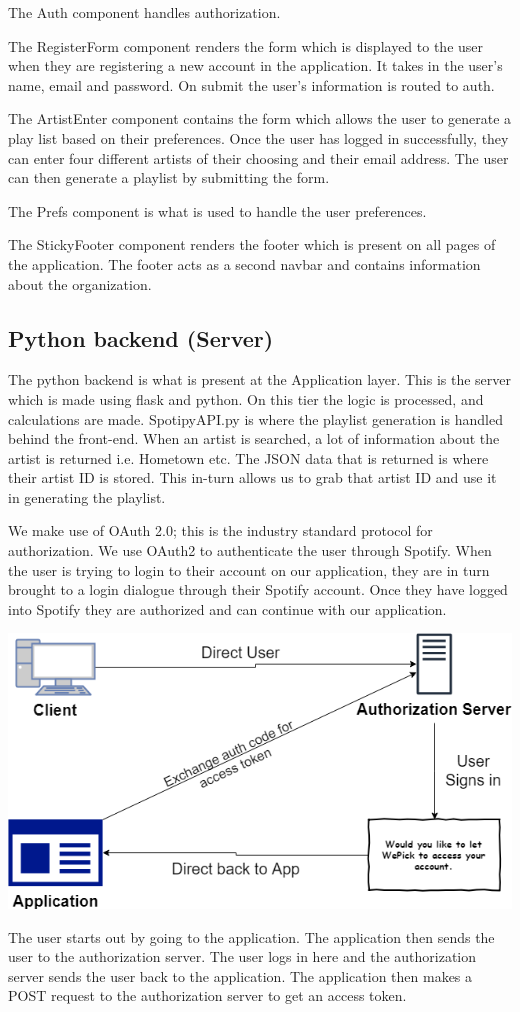 The Auth component handles authorization.

The RegisterForm component renders the form which is displayed to the user when they are registering a new account in the application. It takes in the user’s name, email and password. On submit the user’s information is routed to auth.

The ArtistEnter component contains the form which allows the user to generate a play list based on their preferences. Once the user has logged in successfully, they can enter four different artists of their choosing and their email address. The user can then generate a playlist by submitting the form.

The Prefs component is what is used to handle the user preferences.

The StickyFooter component renders the footer which is present on all pages of the application. The footer acts as a second navbar and contains information about the organization.

\subsection{Python backend (Server)}
The python backend is what is present at the Application layer. This is the server which is made using flask and python. On this tier the logic is processed, and calculations are made.
SpotipyAPI.py is where the playlist generation is handled behind the front-end. When an artist is searched, a lot of information about the artist is returned i.e. Hometown etc.
The JSON data that is returned is where their artist ID is stored. This in-turn allows us to grab that artist ID and use it in generating the playlist. 

We make use of OAuth 2.0; this is the industry standard protocol for authorization. We use OAuth2 to authenticate the user through Spotify. When the user is trying to login to their account on our application, they are in turn brought to a login dialogue through their Spotify account. Once they have logged into Spotify they are authorized and can continue with our application. 

\begin{center}    
	\includegraphics{img/auth.png}
\end{center}
The user starts out by going to the application. The application then sends the user to the authorization server. The user logs in here and the authorization server sends the user back to the application. The application then makes a POST request to the authorization server to get an access token.

